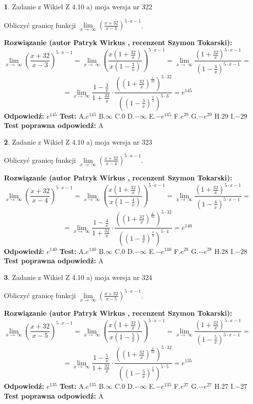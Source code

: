 \documentclass[12pt, a4paper]{article}
\theoremstyle{definition} %
\newtheorem{zad}{}
\newcommand{\zadStart}[1]{\begin{zad}#1\newline}
\newcommand{\zadStop}{\end{zad}}
\newcommand{\rozwStart}[2]{\noindent \textbf{Rozwiązanie (autor #1 , recenzent #2): }\newline}
\newcommand{\rozwStop}{\newline}
\newcommand{\odpStart}{\noindent \textbf{Odpowiedź:}\newline}
\newcommand{\odpStop}{\newline}
\newcommand{\testStart}{\noindent \textbf{Test:}\newline}
\newcommand{\testStop}{\newline}
\newcommand{\kluczStart}{\noindent \textbf{Test poprawna odpowiedź:}\newline}
\newcommand{\kluczStop}{\newline}
\begin{document}
\zadStart{Zadanie z Wikieł Z 4.10 a) moja wersja nr 322}

Obliczyć granicę funkcji  $\lim\limits_{x\to\ \infty}(\frac{x+32}{x-3})^{5\cdot x-1}$.
\zadStop
\rozwStart{Patryk Wirkus}{Szymon Tokarski}
$$\lim\limits_{x\to\ \infty}(\frac{x+32}{x-3})^{5\cdot x-1} = \lim\limits_{x\to\ \infty}(\frac{x(1+\frac{32}{x})}{x(1-\frac{3}{x})})^{5\cdot x-1}=\lim\limits_{x\to\ \infty}\frac{(1+\frac{32}{x})^{5\cdot x-1}}{(1-\frac{3}{x})^{5\cdot x-1}}=$$
$$=\lim\limits_{x\to\ \infty}\frac{1-\frac{3}{x}}{1+\frac{32}{x}}\cdot\frac{((1+\frac{32}{x})^{\frac{x}{32}})^{5\cdot32}}{((1-\frac{3}{x})^{\frac{x}{3}})^{5\cdot3}}=e^{145}$$
\rozwStop
\odpStart
$e^{145}$
\odpStop
\testStart
A.$e^{145}$ B.$\infty$ C.$0$ D.$-\infty$ E.$-e^{145}$
F.$e^{29}$ G.$-e^{29}$
H.$29$
I.$-29$
\testStop
\kluczStart
A
\kluczStop



\zadStart{Zadanie z Wikieł Z 4.10 a) moja wersja nr 323}

Obliczyć granicę funkcji  $\lim\limits_{x\to\ \infty}(\frac{x+32}{x-4})^{5\cdot x-1}$.
\zadStop
\rozwStart{Patryk Wirkus}{Szymon Tokarski}
$$\lim\limits_{x\to\ \infty}(\frac{x+32}{x-4})^{5\cdot x-1} = \lim\limits_{x\to\ \infty}(\frac{x(1+\frac{32}{x})}{x(1-\frac{4}{x})})^{5\cdot x-1}=\lim\limits_{x\to\ \infty}\frac{(1+\frac{32}{x})^{5\cdot x-1}}{(1-\frac{4}{x})^{5\cdot x-1}}=$$
$$=\lim\limits_{x\to\ \infty}\frac{1-\frac{4}{x}}{1+\frac{32}{x}}\cdot\frac{((1+\frac{32}{x})^{\frac{x}{32}})^{5\cdot32}}{((1-\frac{4}{x})^{\frac{x}{4}})^{5\cdot4}}=e^{140}$$
\rozwStop
\odpStart
$e^{140}$
\odpStop
\testStart
A.$e^{140}$ B.$\infty$ C.$0$ D.$-\infty$ E.$-e^{140}$
F.$e^{28}$ G.$-e^{28}$
H.$28$
I.$-28$
\testStop
\kluczStart
A
\kluczStop



\zadStart{Zadanie z Wikieł Z 4.10 a) moja wersja nr 324}

Obliczyć granicę funkcji  $\lim\limits_{x\to\ \infty}(\frac{x+32}{x-5})^{5\cdot x-1}$.
\zadStop
\rozwStart{Patryk Wirkus}{Szymon Tokarski}
$$\lim\limits_{x\to\ \infty}(\frac{x+32}{x-5})^{5\cdot x-1} = \lim\limits_{x\to\ \infty}(\frac{x(1+\frac{32}{x})}{x(1-\frac{5}{x})})^{5\cdot x-1}=\lim\limits_{x\to\ \infty}\frac{(1+\frac{32}{x})^{5\cdot x-1}}{(1-\frac{5}{x})^{5\cdot x-1}}=$$
$$=\lim\limits_{x\to\ \infty}\frac{1-\frac{5}{x}}{1+\frac{32}{x}}\cdot\frac{((1+\frac{32}{x})^{\frac{x}{32}})^{5\cdot32}}{((1-\frac{5}{x})^{\frac{x}{5}})^{5\cdot5}}=e^{135}$$
\rozwStop
\odpStart
$e^{135}$
\odpStop
\testStart
A.$e^{135}$ B.$\infty$ C.$0$ D.$-\infty$ E.$-e^{135}$
F.$e^{27}$ G.$-e^{27}$
H.$27$
I.$-27$
\testStop
\kluczStart
A
\kluczStop
\end{document}
